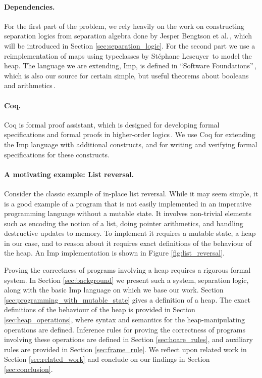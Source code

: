\paragraph{Dependencies.}
For the first part of the problem, we rely heavily on the work on constructing separation logics from separation algebra done by Jesper Bengtson et al.\,\cite{BirkedalL:veroop-conf}, which will be introduced in Section \ref{sec:separation_logic}. For the second part we use a reimplementation of maps using typeclasses by Stéphane Lescuyer\,\cite{CoqContainers} to model the heap. The language we are extending, Imp, is defined in ``Software Foundations''\,\cite{Pierce:SF}, which is also our source for certain simple, but useful theorems about booleans and arithmetics\,\cite{SfLib}.

\paragraph{Coq.}
Coq is formal proof assistant, which is designed for developing formal specifications and formal proofs in higher-order logics\,\cite{CoqIntro}. We use Coq for extending the Imp language with additional constructs, and for writing and verifying formal specifications for these constructs.

\paragraph{A motivating example: List reversal.}
Consider the classic example of in-place list reversal. While it may seem simple, it is a good example of a program that is not easily implemented in an imperative programming language without a mutable state. It involves non-trivial elements such as encoding the notion of a list, doing pointer arithmetics, and handling destructive updates to memory. To implement it requires a mutable state, a heap in our case, and to reason about it requires exact definitions of the behaviour of the heap. An Imp implementation is shown in Figure \ref{fig:list_reversal}.

Proving the correctness of programs involving a heap requires a rigorous formal system. In Section \ref{sec:background} we present such a system, separation logic, along with the basic Imp language on which we base our work. Section \ref{sec:programming_with_mutable_state} gives a definition of a heap. The exact definitions of the behaviour of the heap is provided in Section \ref{sec:heap_operations}, where syntax and semantics for the heap-manipulating operations are defined. Inference rules for proving the correctness of programs involving these operations are defined in Section \ref{sec:hoare_rules}, and auxiliary rules are provided in Section \ref{sec:frame_rule}. We reflect upon related work in Section \ref{sec:related_work} and conclude on our findings in Section \ref{sec:conclusion}.


